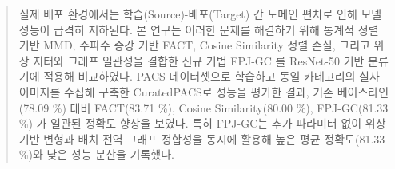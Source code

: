 \begin{abstract}
실제 배포 환경에서는 학습(Source)-배포(Target) 간 도메인 편차로 인해 모델 성능이 급격히 저하된다. 본 연구는 이러한 문제를 해결하기 
위해 통계적 정렬 기반 MMD, 주파수 증강 기반 FACT, Cosine Similarity 정렬 손실, 그리고 위상 지터와 그래프 일관성을 결합한 신규 기법 
FPJ-GC 를 ResNet-50 기반 분류기에 적용해 비교하였다. PACS 데이터셋으로 학습하고 동일 카테고리의 실사 이미지를 수집해 구축한 
CuratedPACS로 성능을 평가한 결과, 기존 베이스라인(78.09 \%) 대비 FACT(83.71 \%), Cosine Similarity(80.00 \%), FPJ-GC(81.33 \%) 
가 일관된 정확도 향상을 보였다. 특히 FPJ-GC는 추가 파라미터 없이 위상 기반 변형과 배치 전역 그래프 정합성을 동시에 활용해 높은 
평균 정확도(81.33 \%)와 낮은 성능 분산을 기록했다.
\end{abstract}